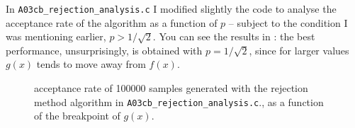 \documentclass{gulartcl}
\begin{document}
In \texttt{A03cb\_rejection\_analysis.c} I modified slightly the code to analyse
the acceptance rate of the algorithm as a function of $p$ – subject to the
condition I was mentioning earlier, $p > 1 / \sqrt{2}$. You can see the results
in : the best performance, unsurprisingly, is obtained with $p
= 1 / \sqrt{2}$, since for larger values $g(x)$ tends to move away from $f(x)$.

\begin{figure}
    \centering
    
    \caption{acceptance rate of \num{100000} samples generated with the
        rejection method algorithm in \texttt{A03cb\_rejection\_analysis.c}., as
        a function of the breakpoint of $g(x)$.}
    \label{fig:A03cb}
\end{figure}
\end{document}
